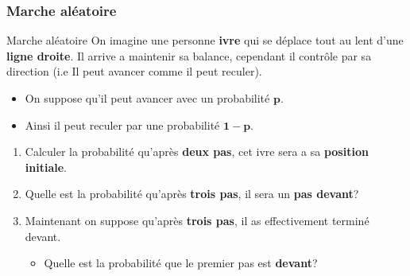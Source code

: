 \documentclass{beamer}
\begin{document}
  \begin{frame}[t]
    \frametitle{Marche aléatoire}
    
    \begin{block}{Marche aléatoire}
      \scriptsize
      On imagine une personne \textbf{ivre} qui se déplace tout au lent d'une
      \alert{\textbf{ligne droite}}. Il arrive a maintenir sa balance, cependant
      il contrôle par sa direction (i.e Il peut avancer comme il peut
      reculer).\\[4pt]

      \begin{itemize}
        \scriptsize
        \item On suppose qu'il peut avancer avec un probabilité $\mathbf{p}$.
        \item Ainsi il peut reculer par une probabilité $\mathbf{1-p}$.
      \end{itemize}
    \end{block}

    \vspace*{.5cm}
    \begin{enumerate}
      \scriptsize
      \item Calculer la probabilité qu'après  \alert{\textbf{deux pas}}, cet
        ivre sera a sa \textbf{position initiale}.\\[4pt]
      \item Quelle est la probabilité qu'après \alert{\textbf{trois pas}}, il
        sera un \textbf{pas devant}?\\[4pt]
      \item Maintenant on suppose qu'après \textbf{trois pas}, il as
        effectivement terminé devant.
        \begin{itemize}
          \scriptsize
          \item Quelle est la probabilité que le premier pas est
            \textbf{devant}?
        \end{itemize}

    \end{enumerate}
  \end{frame}
\end{document}
